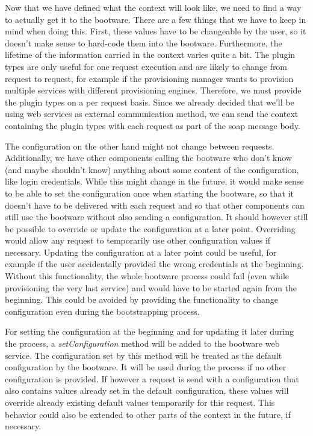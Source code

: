 Now that we have defined what the context will look like, we need to find a way to actually get it to the bootware.
There are a few things that we have to keep in mind when doing this.
First, these values have to be changeable by the user, so it doesn't make sense to hard-code them into the bootware.
Furthermore, the lifetime of the information carried in the context varies quite a bit.
The plugin types are only useful for one request execution and are likely to change from request to request, for example if the provisioning manager wants to provision multiple services with different provisioning engines.
Therefore, we must provide the plugin types on a per request basis.
Since we already decided that we'll be using web services as external communication method, we can send the context containing the plugin types with each request as part of the soap message body.

The configuration on the other hand might not change between requests.
Additionally, we have other components calling the bootware who don't know (and maybe shouldn't know) anything about some content of the configuration, like login credentials.
While this might change in the future, it would make sense to be able to set the configuration once when starting the bootware, so that it doesn't have to be delivered with each request and so that other components can still use the bootware without also sending a configuration.
It should however still be possible to override or update the configuration at a later point.
Overriding would allow any request to temporarily use other configuration values if necessary.
Updating the configuration at a later point could be useful, for example if the user accidentally provided the wrong credentials at the beginning.
Without this functionality, the whole bootware process could fail (even while provisioning the very last service) and would have to be started again from the beginning.
This could be avoided by providing the functionality to change configuration even during the bootstrapping process.

For setting the configuration at the beginning and for updating it later during the process, a \textit{setConfiguration} method will be added to the bootware web service.
The configuration set by this method will be treated as the default configuration by the bootware.
It will be used during the process if no other configuration is provided.
If however a request is send with a configuration that also contains values already set in the default configuration, these values will override already existing default values temporarily for this request.
This behavior could also be extended to other parts of the context in the future, if necessary.
